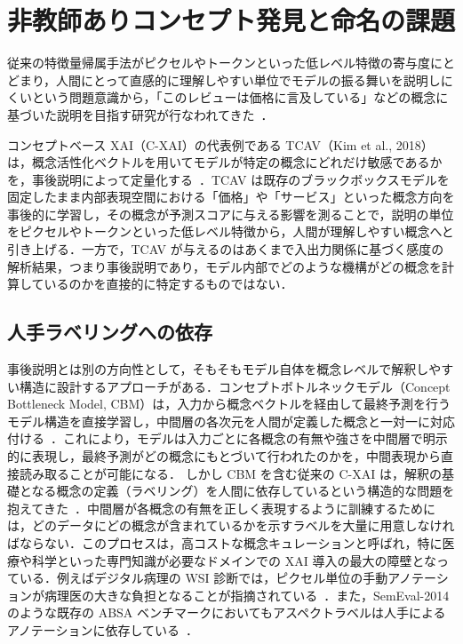 \section{非教師ありコンセプト発見と命名の課題}

従来の特徴量帰属手法がピクセルやトークンといった低レベル特徴の寄与度にとどまり，人間にとって直感的に理解しやすい単位でモデルの振る舞いを説明しにくいという問題意識から，「このレビューは価格に言及している」などの概念に基づいた説明を目指す研究が行なわれてきた~\cite{kim2018interpretability}．

コンセプトベース XAI（C-XAI）の代表例である TCAV（Kim et al., 2018）は，概念活性化ベクトルを用いてモデルが特定の概念にどれだけ敏感であるかを，事後説明によって定量化する~\cite{kim2018interpretability}．TCAV は既存のブラックボックスモデルを固定したまま内部表現空間における「価格」や「サービス」といった概念方向を事後的に学習し，その概念が予測スコアに与える影響を測ることで，説明の単位をピクセルやトークンといった低レベル特徴から，人間が理解しやすい概念へと引き上げる．一方で，TCAV が与えるのはあくまで入出力関係に基づく感度の解析結果，つまり事後説明であり，モデル内部でどのような機構がどの概念を計算しているのかを直接的に特定するものではない．

\subsection{人手ラベリングへの依存}

事後説明とは別の方向性として，そもそもモデル自体を概念レベルで解釈しやすい構造に設計するアプローチがある．コンセプトボトルネックモデル（Concept Bottleneck Model, CBM）は，入力から概念ベクトルを経由して最終予測を行うモデル構造を直接学習し，中間層の各次元を人間が定義した概念と一対一に対応付ける~\cite{koh2020concept}．これにより，モデルは入力ごとに各概念の有無や強さを中間層で明示的に表現し，最終予測がどの概念にもとづいて行われたのかを，中間表現から直接読み取ることが可能になる．
しかし CBM を含む従来の C-XAI は，解釈の基礎となる概念の定義（ラベリング）を人間に依存しているという構造的な問題を抱えてきた~\cite{kim2018interpretability,koh2020concept}．中間層が各概念の有無を正しく表現するように訓練するためには，どのデータにどの概念が含まれているかを示すラベルを大量に用意しなければならない．このプロセスは，高コストな概念キュレーションと呼ばれ，特に医療や科学といった専門知識が必要なドメインでの XAI 導入の最大の障壁となっている．例えばデジタル病理の WSI 診断では，ピクセル単位の手動アノテーションが病理医の大きな負担となることが指摘されている~\cite{nan2025deep}．また，SemEval-2014 のような既存の ABSA ベンチマークにおいてもアスペクトラベルは人手によるアノテーションに依存している~\cite{pontiki-EtAl:2014:SemEval2014Task4}．

